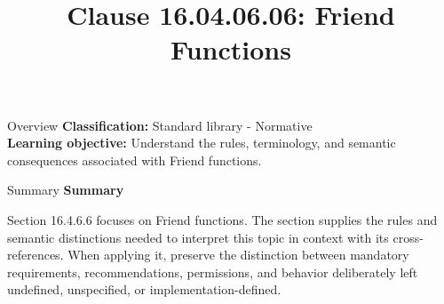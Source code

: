 \documentclass[10pt,letterpaper]{article}
\title{Clause 16.04.06.06: Friend Functions}
\author{}
\date{}
\begin{document}
\maketitle
\begin{CornellOverviewBox}{Overview}
\textbf{Classification:} Standard library - Normative\\[2pt]
\textbf{Learning objective:} Understand the rules, terminology, and semantic consequences associated with Friend functions.
\end{CornellOverviewBox}\begin{CornellSummaryBox}{Summary}
{\sffamily\bfseries\color{Accent} Summary}\par\vspace{3pt}Section 16.4.6.6 focuses on Friend functions. The section supplies the rules and semantic distinctions needed to interpret this topic in context with its cross-references. When applying it, preserve the distinction between mandatory requirements, recommendations, permissions, and behavior deliberately left undefined, unspecified, or implementation-defined.
\end{CornellSummaryBox}
\end{document}
